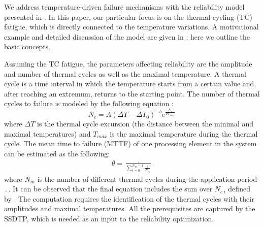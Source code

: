 We address temperature-driven failure mechanisms with the reliability model presented in \cite{huang2009, xiang2010}. In this paper, our particular focus is on the thermal cycling (TC) fatigue, which is directly connected to the temperature variations. A motivational example and detailed discussion of the model are given in ; here we outline the basic concepts.

Assuming the TC fatigue, the parameters affecting reliability are the amplitude and number of thermal cycles as well as the maximal temperature. A thermal cycle is a time interval in which the temperature starts from a certain value and, after reaching an extremum, returns to the starting point. The number of thermal cycles to failure is modeled by the following equation \cite{xiang2010, jedec2010}:
\begin{equation} \label{eq:cycles-to-failure}
  N_c = A (\Delta T - \Delta T_0)^{-b} e^{\frac{E_a}{k T_{max}}}
\end{equation}
where $\Delta T$ is the thermal cycle excursion (the distance between the minimal and maximal temperatures) and $T_{max}$ is the maximal temperature during the thermal cycle. The mean time to failure (MTTF) of one processing element in the system can be estimated as the following:
\begin{align} \label{eq:one-mttf}
  \theta = \frac{\period}{\sum_{i=0}^{N_m - 1} \frac{1}{N_{c \: i}}}
\end{align}
where $N_m$ is the number of different thermal cycles during the application period $\period$. It can be observed that the final equation includes the sum over $N_{c \: i}$ defined by . The computation requires the identification of the thermal cycles with their amplitudes and maximal temperatures. All the prerequisites are captured by the SSDTP, which is needed as an input to the reliability optimization.
